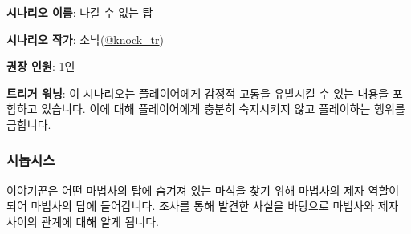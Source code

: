 \documentclass{report}
\begin{document}
	\textbf{시나리오 이름}: 나갈 수 없는 탑
	
	\textbf{시나리오 작가}: 소낙(\href{https://twitter.com/knock_tr}{@knock\_tr})
	
	\textbf{권장 인원}: 1인
	
	\textbf{트리거 워닝}: 이 시나리오는 플레이어에게 감정적 고통을 유발시킬 수 있는 내용을 포함하고 있습니다. 이에 대해 플레이어에게 충분히 숙지시키지 않고 플레이하는 행위를 금합니다.
	
	\subsubsection*{시놉시스}
	
	이야기꾼은 어떤 마법사의 탑에 숨겨져 있는 마석을 찾기 위해 마법사의 제자 역할이 되어 마법사의 탑에 들어갑니다. 조사를 통해 발견한 사실을 바탕으로 마법사와 제자 사이의 관계에 대해 알게 됩니다.
\end{document}
